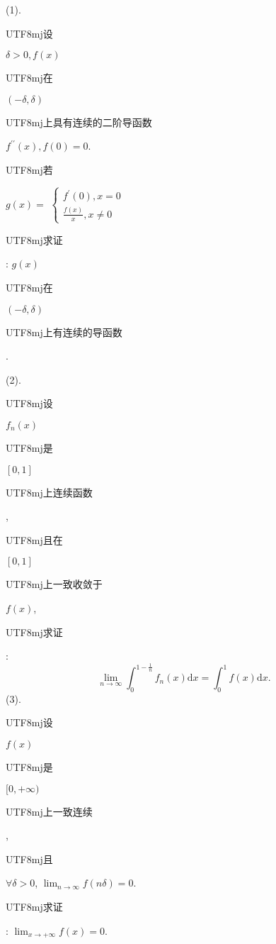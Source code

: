 \documentclass[10pt]{article}
\begin{document}
(1). \begin{CJK}{UTF8}{mj}设\end{CJK} $\delta>0, f(x)$ \begin{CJK}{UTF8}{mj}在\end{CJK} $(-\delta, \delta)$ \begin{CJK}{UTF8}{mj}上具有连续的二阶导函数\end{CJK} $f^{\prime \prime}(x), f(0)=0$. \begin{CJK}{UTF8}{mj}若\end{CJK} $g(x)=$ $\left\{\begin{array}{l}f^{\prime}(0), x=0 \\ \frac{f(x)}{x}, x \neq 0\end{array}\right.$ \begin{CJK}{UTF8}{mj}求证\end{CJK}: $g(x)$ \begin{CJK}{UTF8}{mj}在\end{CJK} $(-\delta, \delta)$ \begin{CJK}{UTF8}{mj}上有连续的导函数\end{CJK}.

(2). \begin{CJK}{UTF8}{mj}设\end{CJK} $f_{n}(x)$ \begin{CJK}{UTF8}{mj}是\end{CJK} $[0,1]$ \begin{CJK}{UTF8}{mj}上连续函数\end{CJK}, \begin{CJK}{UTF8}{mj}且在\end{CJK} $[0,1]$ \begin{CJK}{UTF8}{mj}上一致收敛于\end{CJK} $f(x)$, \begin{CJK}{UTF8}{mj}求证\end{CJK}:
$$
\lim _{n \rightarrow \infty} \int_{0}^{1-\frac{1}{n}} f_{n}(x) \mathrm{d} x=\int_{0}^{1} f(x) \mathrm{d} x .
$$
(3). \begin{CJK}{UTF8}{mj}设\end{CJK} $f(x)$ \begin{CJK}{UTF8}{mj}是\end{CJK} $[0,+\infty)$ \begin{CJK}{UTF8}{mj}上一致连续\end{CJK}, \begin{CJK}{UTF8}{mj}且\end{CJK} $\forall \delta>0$, $\lim _{n \rightarrow \infty} f(n \delta)=0$. \begin{CJK}{UTF8}{mj}求证\end{CJK}: $\lim _{x \rightarrow+\infty} f(x)=0$.
\end{document}
